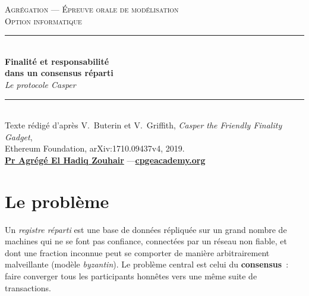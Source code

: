 \documentclass[11pt,a4paper]{article}
\theoremstyle{plain}
\theoremstyle{definition}
\begin{document}
\thispagestyle{fancy}

\begin{center}
{\small\scshape Agrégation --- Épreuve orale de modélisation}\\[2pt]
{\small\scshape Option informatique}\\[10pt]
\rule{0.92\linewidth}{0.5pt}\\[8pt]
{\LARGE\bfseries Finalité et responsabilité}\\[4pt]
{\LARGE\bfseries dans un consensus réparti}\\[8pt]
{\large\itshape Le protocole Casper}\\[10pt]
\rule{0.92\linewidth}{0.5pt}\\[10pt]
{\small Texte rédigé d'après V.~Buterin et V.~Griffith, \emph{Casper the Friendly Finality
Gadget},\\ Ethereum Foundation, arXiv:1710.09437v4, 2019.}\\[8pt]
{\small \href{https://orcid.org/0000-0002-6108-7176}{\textbf{Pr Agrégé El Hadiq Zouhair}}
\quad---\quad \href{https://cpgeacademy.org}{\textbf{cpgeacademy.org}}}
\end{center}

\vspace{4mm}
\noindent{}
\vspace{3mm}

\section{Le problème}

Un \emph{registre réparti} est une base de données répliquée sur un grand nombre de machines
qui ne se font pas confiance, connectées par un réseau non fiable, et dont une fraction
inconnue peut se comporter de manière arbitrairement malveillante (modèle
\emph{byzantin}). Le problème central est celui du \textbf{consensus}~: faire converger tous
les participants honnêtes vers une même suite de transactions.
\end{document}
